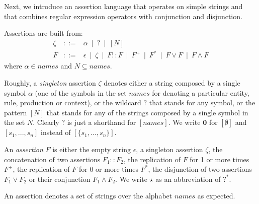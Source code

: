 Next, we introduce an assertion language that operates on simple strings
and that combines regular expression operators with conjunction and disjunction.


\begin{definition}
\label{def:assetionl}
Assertions are built from: 
$$
\begin{array}{lcl}
\zeta & ::= & 
\alpha ~\mid ~ 
? ~\mid ~ 
[N]
\\
F & ::= & 
\epsilon ~\mid ~ 
\zeta ~\mid ~ 
F::F ~\mid ~ 
F^+ ~\mid ~ 
F^* ~\mid ~ 
F \vee F ~\mid ~ 
F \wedge F
\end{array}
$$
where $\alpha \in \mathit{names}$ and $N\subseteq \mathit{names}$.
\end{definition}

Roughly, a \emph{singleton} assertion $\zeta$ denotes either a string composed by a single symbol $\alpha$ (one of the symbols in the set $\mathit{names}$ for denoting a particular entity, rule, production or context), or
the wildcard $?$ that stands for any symbol, or the pattern $[N]$ that stands for any of the strings composed by a single symbol in the set $N$. Clearly $?$  is just a shorthand for $[\mathit{names}]$.
We write $\mathbf{0}$ for $[\emptyset]$ and $[s_1,...,s_n]$ instead of $[\{s_1,...,s_n\}]$. 

An \emph{assertion} $F$ is either the empty string $\epsilon$, a singleton assertion $\zeta$, the concatenation of two assertions $F_1::F_2$, the replication of $F$ for 1 or more times $F^+$, the replication of $F$ for 0 or more times $F^*$, the disjunction of two assertions $F_1 \vee F_2$ or their conjunction $F_1 \wedge F_2$. We write $\star$ as an abbreviation of $?^*$.

An assertion denotes a set of strings over the alphabet $\mathit{names}$ as expected.

